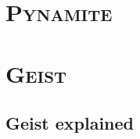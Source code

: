\documentclass[xcolor=x11names,compress]{beamer}
\renewcommand{\(}{\begin{columns}}
\renewcommand{\)}{\end{columns}}
\newcommand{\<}[1]{\begin{column}{#1}}
\renewcommand{\>}{\end{column}}
\begin{document}
\section{ \scshape Pynamite}
\subsection{}

\begin{frame}
\frametitle{}


\end{frame}

\subsection{}
\begin{frame}
\frametitle{}


\end{frame}

\subsection{}
\begin{frame}
\frametitle{}

\end{frame}


\begin{frame}
\frametitle{}

\end{frame}


\begin{frame}
\frametitle{}
\vspace{3mm}

\end{frame}


\begin{frame}
\frametitle{}


\end{frame}

\begin{frame}
\frametitle{}

\end{frame}




\section{ \scshape Geist}

\subsection{Geist explained}
\begin{frame}
\frametitle{}

\end{frame}
\end{document}
